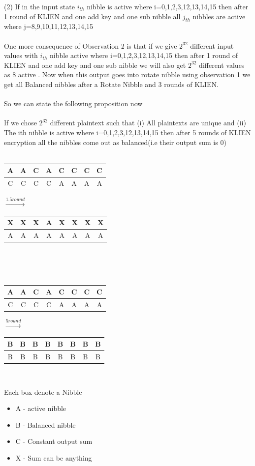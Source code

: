\documentclass[preprint]{transcrypto}
\begin{document}
(2) If in the input state $i_{th}$ nibble is active where i=0,1,2,3,12,13,14,15 then after 1 round of KLIEN and one add key and one sub nibble all $j_{th}$ nibbles are active where j=8,9,10,11,12,13,14,15\\ \\
One more consequence of Observation 2 is that if we give $2^{32}$ different input values with $i_{th}$ nibble  active where i=0,1,2,3,12,13,14,15 then after 1 round of KLIEN and one add key and one sub nibble we will also get $2^32$ different values as 8 active . Now when this output goes into rotate nibble using observation 1 we get all Balanced nibbles after a Rotate Nibble and 3 rounds of KLIEN.\\ \\
So we can state the following proposition now 
\\ \\
If we chose $2^{32}$ different plaintext such that (i) All plaintexts are unique and (ii) The ith nibble is active where i=0,1,2,3,12,13,14,15  then after 5 rounds of KLIEN encryption all the nibbles come out as balanced(i.e their output sum is 0)\\ \vspace{0.1\linewidth}\\
\begin{tabular}{|c|c|c|c|c|c|c|c|}
	\hline
	A & A & C & A & C & C & C & C \\
	\hline
	C & C & C & C & A & A & A & A\\
	\hline
\end{tabular}
$\xrightarrow{1.5round}$
\begin{tabular}{c|c|c|c|c|c|c|c|}
	\hline
	X & X & X & A & X & X & X & X \\
	\hline
	A & A & A & A & A & A & A & A\\
	\hline
\end{tabular}\\
\\ \vspace{0.1\linewidth}\\
\begin{tabular}{|c|c|c|c|c|c|c|c|}
	\hline
	A & A & C & A & C & C & C & C \\
	\hline
	C & C & C & C & A & A & A & A\\
	\hline
\end{tabular}
$\xrightarrow{5round}$
\begin{tabular}{|c|c|c|c|c|c|c|c|}
	\hline
	B & B & B & B & B & B & B & B \\
	\hline
	B & B & B & B & B & B & B & B\\
	\hline
\end{tabular}
\\ 
\begin{center}
	Each box denote a Nibble \\
	\begin{itemize}
		\item A - active nibble
		\item B - Balanced nibble
		\item C - Constant output sum
		\item X - Sum can be anything
	\end{itemize}
\end{center}
\end{document}
